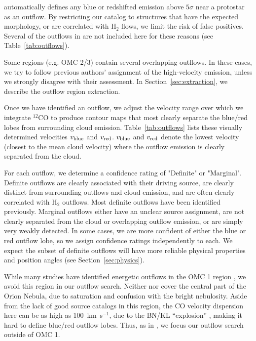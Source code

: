\documentclass[twocolumn]{aastex63}
\newcommand{\co}[1][]{\ensuremath{^{#1}}CO}
\begin{document}
\citet{Tanabe19} automatically defines any blue or redshifted emission above $5\sigma$ near a protostar as an outflow. By restricting our catalog to structures that have the expected morphology, or are correlated with H$_2$ flows, we limit the risk of false positives. Several of the outflows in \citet{Tanabe19} are not included here for these reasons (see Table~\ref{tab:outflows}).

Some regions (e.g. OMC 2/3) contain several overlapping outflows. In these cases, we try to follow previous authors' assignment of the high-velocity emission, unless we strongly disagree with their assessment. In Section~\ref{sec:extraction}, we describe the outflow region extraction.

Once we have identified an outflow, we adjust the velocity range over which we integrate \co[12]{} to produce contour maps that most clearly separate the blue/red lobes from surrounding cloud emission. Table~\ref{tab:outflows} lists these visually determined velocities $v_{\rm blue}$ and $v_{\rm red}$. $v_{\rm blue}$ and $v_{\rm red}$ denote the lowest velocity (closest to the mean cloud velocity) where the outflow emission is clearly separated from the cloud. 

For each outflow, we determine a confidence rating of "Definite" or "Marginal". Definite outflows are clearly associated with their driving source, are clearly distinct from surrounding outflows and cloud emission, and are often clearly correlated with H$_2$ outflows. Most definite outflows have been identified previously. Marginal outflows either have an unclear source assignment, are not clearly separated from the cloud or overlapping outflow emission, or are simply very weakly detected. In some cases, we are more confident of either the blue or red outflow lobe, so we assign confidence ratings independently to each. We expect the subset of definite outflows will have more reliable physical properties and position angles (see Section~\ref{sec:physics}).

While many studies have identified energetic outflows in the OMC 1 region \citep[e.g.][]{Schmid-Burgk90,Zapata05,Teixeira16,Bally17}, we avoid this region in our outflow search. Neither \citet{Davis09} nor \citet{Furlan16} cover the central part of the Orion Nebula, due to saturation and confusion with the bright nebulosity. Aside from the lack of good source catalogs in this region, the CO velocity dispersion here can be as high as 100~km~s$^{-1}$, due to the BN/KL ``explosion'' \citep{Bally17}, making it hard to define blue/red outflow lobes. Thus, as in \citet{Tanabe19}, we focus our outflow search outside of OMC 1. 
\end{document}
